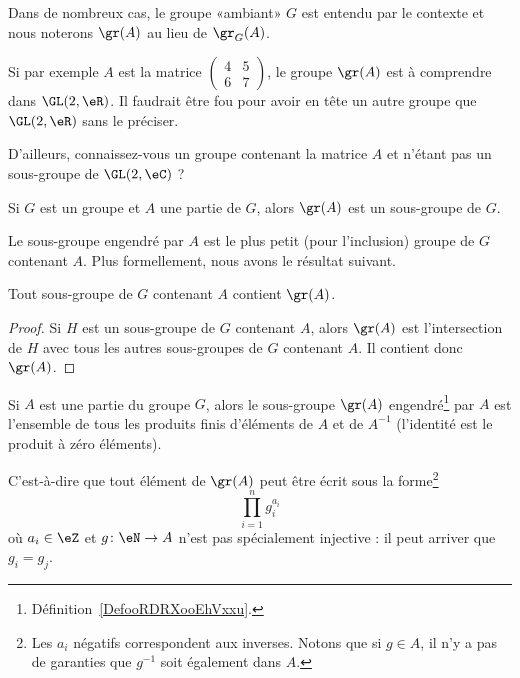 \begin{normaltext}
    Dans de nombreux cas, le groupe «ambiant» \( G\) est entendu par le contexte et nous noterons \( \gr(A)\) au lieu de \( \gr_G(A)\).

    Si par exemple \( A\) est la matrice \( \begin{pmatrix}
        4    &   5    \\ 
        6    &   7    
    \end{pmatrix}\), le groupe \( \gr(A)\) est à comprendre dans \( \GL(2,\eR)\). Il faudrait être fou pour avoir en tête un autre groupe que \( \GL(2,\eR)\) sans le préciser.

    D'ailleurs, connaissez-vous un groupe contenant la matrice \( A\) et n'étant pas un sous-groupe de \( \GL(2,\eC)\) ?
\end{normaltext}

\begin{lemma}
    Si \( G\) est un groupe et \( A\) une partie de \( G\), alors \( \gr(A)\) est un sous-groupe de \( G\).
\end{lemma}

Le sous-groupe engendré par \( A \) est le plus petit (pour l'inclusion) groupe de \( G\) contenant \( A\). Plus formellement, nous avons le résultat suivant.
\begin{lemma}
    Tout sous-groupe de \( G\) contenant \( A\) contient \( \gr(A)\).
\end{lemma}

\begin{proof}
    Si \( H\) est un sous-groupe de \( G\) contenant \( A\), alors \( \gr(A)\) est l'intersection de \( H\) avec tous les autres sous-groupes de \( G\) contenant \( A\). Il contient donc \( \gr(A)\).
\end{proof}

\begin{lemma}   \label{LemFUIZooBZTCiy}
    Si \( A\) est une partie du groupe \( G\), alors le sous-groupe \( \gr(A)\) engendré\footnote{Définition~\ref{DefooRDRXooEhVxxu}.} par \( A\) est l'ensemble de tous les produits finis d'éléments de \( A\) et de \( A^{-1}\) (l'identité est le produit à zéro éléments).

    C'est-à-dire que tout élément de \( \gr(A)\) peut être écrit sous la forme\footnote{Les \( a_i\) négatifs correspondent aux inverses. Notons que si \( g\in A\), il n'y a pas de garanties que \( g^{-1}\) soit également dans \( A\).}
    \begin{equation}
        \prod_{i=1}^ng_i^{a_i}
    \end{equation}
    où \( a_i\in \eZ\) et \( g\colon \eN\to A\) n'est pas spécialement injective : il peut arriver que \( g_i=g_j\).
\end{lemma}

